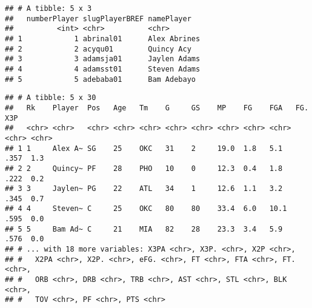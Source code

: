 \documentclass[]{article}
\newenvironment{Shaded}{\begin{snugshade}}{\end{snugshade}}
\newcommand{\KeywordTok}[1]{\textcolor[rgb]{0.13,0.29,0.53}{\textbf{#1}}}
\newcommand{\DataTypeTok}[1]{\textcolor[rgb]{0.13,0.29,0.53}{#1}}
\newcommand{\DecValTok}[1]{\textcolor[rgb]{0.00,0.00,0.81}{#1}}
\newcommand{\StringTok}[1]{\textcolor[rgb]{0.31,0.60,0.02}{#1}}
\newcommand{\OtherTok}[1]{\textcolor[rgb]{0.56,0.35,0.01}{#1}}
\newcommand{\OperatorTok}[1]{\textcolor[rgb]{0.81,0.36,0.00}{\textbf{#1}}}
\newcommand{\NormalTok}[1]{#1}
\begin{document}
\begin{Shaded}
\end{Shaded}

\begin{verbatim}
## # A tibble: 5 x 3
##   numberPlayer slugPlayerBREF namePlayer  
##          <int> <chr>          <chr>       
## 1            1 abrinal01      Alex Abrines
## 2            2 acyqu01        Quincy Acy  
## 3            3 adamsja01      Jaylen Adams
## 4            4 adamsst01      Steven Adams
## 5            5 adebaba01      Bam Adebayo
\end{verbatim}

\begin{Shaded}
\end{Shaded}

\begin{verbatim}
## # A tibble: 5 x 30
##   Rk    Player  Pos   Age   Tm    G     GS    MP    FG    FGA   FG.   X3P  
##   <chr> <chr>   <chr> <chr> <chr> <chr> <chr> <chr> <chr> <chr> <chr> <chr>
## 1 1     Alex A~ SG    25    OKC   31    2     19.0  1.8   5.1   .357  1.3  
## 2 2     Quincy~ PF    28    PHO   10    0     12.3  0.4   1.8   .222  0.2  
## 3 3     Jaylen~ PG    22    ATL   34    1     12.6  1.1   3.2   .345  0.7  
## 4 4     Steven~ C     25    OKC   80    80    33.4  6.0   10.1  .595  0.0  
## 5 5     Bam Ad~ C     21    MIA   82    28    23.3  3.4   5.9   .576  0.0  
## # ... with 18 more variables: X3PA <chr>, X3P. <chr>, X2P <chr>,
## #   X2PA <chr>, X2P. <chr>, eFG. <chr>, FT <chr>, FTA <chr>, FT. <chr>,
## #   ORB <chr>, DRB <chr>, TRB <chr>, AST <chr>, STL <chr>, BLK <chr>,
## #   TOV <chr>, PF <chr>, PTS <chr>
\end{verbatim}
\end{document}
